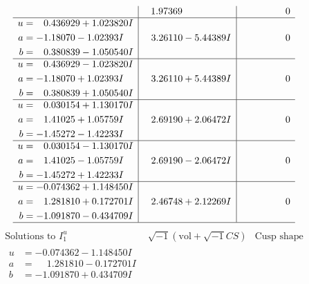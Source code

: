 \documentclass[1p]{elsarticle_modified}
\theoremstyle{definition}
\newcommand{\I}{\sqrt{-1}}
\begin{document}
$$\begin{array}{c|c|c}
 & \phantom{-}1.97369\phantom{ +0.000000I} & \phantom{-0.000000 } 0 \\ \hline\begin{aligned}
u &= \phantom{-}0.436929 + 1.023820 I \\
a &= -1.18070 - 1.02393 I \\
b &= \phantom{-}0.380839 - 1.050540 I\end{aligned}
 & \phantom{-}3.26110 - 5.44389 I & \phantom{-0.000000 } 0 \\ \hline\begin{aligned}
u &= \phantom{-}0.436929 - 1.023820 I \\
a &= -1.18070 + 1.02393 I \\
b &= \phantom{-}0.380839 + 1.050540 I\end{aligned}
 & \phantom{-}3.26110 + 5.44389 I & \phantom{-0.000000 } 0 \\ \hline\begin{aligned}
u &= \phantom{-}0.030154 + 1.130170 I \\
a &= \phantom{-}1.41025 + 1.05759 I \\
b &= -1.45272 - 1.42233 I\end{aligned}
 & \phantom{-}2.69190 + 2.06472 I & \phantom{-0.000000 } 0 \\ \hline\begin{aligned}
u &= \phantom{-}0.030154 - 1.130170 I \\
a &= \phantom{-}1.41025 - 1.05759 I \\
b &= -1.45272 + 1.42233 I\end{aligned}
 & \phantom{-}2.69190 - 2.06472 I & \phantom{-0.000000 } 0 \\ \hline\begin{aligned}
u &= -0.074362 + 1.148450 I \\
a &= \phantom{-}1.281810 + 0.172701 I \\
b &= -1.091870 - 0.434709 I\end{aligned}
 & \phantom{-}2.46748 + 2.12269 I & \phantom{-0.000000 } 0\\
 \hline 
 \end{array}$$\newpage$$\begin{array}{c|c|c}  
\text{Solutions to }I^u_{1}& \I (\text{vol} + \sqrt{-1}CS) & \text{Cusp shape}\\
 \hline 
\begin{aligned}
u &= -0.074362 - 1.148450 I \\
a &= \phantom{-}1.281810 - 0.172701 I \\
b &= -1.091870 + 0.434709 I\end{aligned}

\end{array}$$
\end{document}
